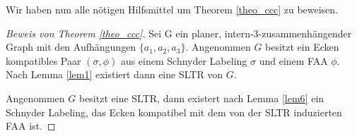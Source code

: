 Wir haben nun alle nötigen Hilfsmittel um Theorem \ref{theo_ccc} zu beweisen. 

\begin{proof}[Beweis von Theorem \ref{theo_ccc}]
Sei G ein planer, intern-3-zusammenhängender Graph mit den Aufhängungen $\{a_1,a_2,a_3\}$. Angenommen $G$ besitzt ein Ecken kompatibles Paar $(\sigma,\phi)$ aus einem Schnyder Labeling $\sigma$ und einem FAA $\phi$. Nach Lemma \ref{lem1} existiert dann eine SLTR von $G$. 

Angenommen $G$ besitzt eine SLTR, dann existert nach Lemma \ref{lem6} ein Schnyder Labeling, das Ecken kompatibel mit dem von der SLTR induzierten FAA ist.
\end{proof}







